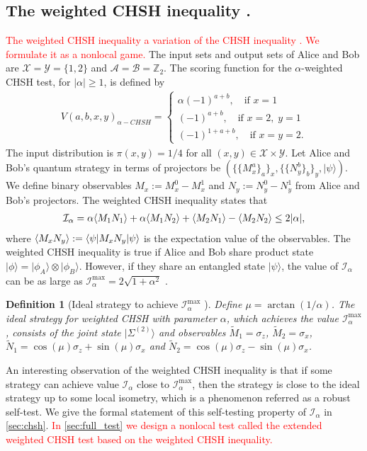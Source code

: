 \documentclass[11pt,letterpaper]{article}
\newcommand{\ket}[1]{|#1\rangle}
\newcommand{\bra}[1]{\langle#1|}
\newcommand{\x}{\otimes}
\DeclarePairedDelimiter{\ip}{\langle}{\rangle}
\newcommand{\Z}{\mathbb{Z}}
\newcommand{\calX}{\mathcal{X}}
\newcommand{\calY}{\mathcal{Y}}
\newcommand{\calA}{\mathcal{A}}
\newcommand{\calB}{\mathcal{B}}
\newcommand{\1}{\mathbb{1}}
\newcommand{\EPR}[1]{\Sigma^{(#1)}}
\newcommand{\paulix}{\sigma_x}
\newcommand{\pauliz}{\sigma_z}
\newcommand{\tM}{\tilde{M}}
\newcommand{\tN}{\tilde{N}}
\newcommand{\I}{\mathcal{I}}
\newcommand{\hf}[1]{\textcolor{red}{#1}}
\newtheorem{definition}[theorem]{Definition}
\theoremstyle{definition}
\begin{document}
\subsection{The weighted CHSH inequality \cite{acin2012}.}
\hf{The weighted CHSH inequality a variation of the CHSH inequality \cite{chsh}. 
We formulate it as a nonlocal game.}
The input sets and output sets of Alice and Bob are
$\calX = \calY = \{1, 2\}$ and $\calA = \calB = \Z_2$.
The scoring function for the $\alpha$-weighted CHSH test, for $|\alpha|\geq 1$, is defined by
\begin{align}
	V(a,b,x,y)_{\alpha-CHSH} = 
	\begin{cases}
		\alpha (-1)^{a + b}, \quad \text{if } x = 1 \\
		(-1)^{a + b}, \quad \text{if } x = 2,\; y = 1 \\
		(-1)^{1 + a + b}, \quad \text{if } x = y = 2.
	\end{cases}
\end{align}
The input distribution is $\pi(x,y) = 1/4$ for all $(x,y) \in \calX \times \calY$.
Let Alice and Bob's quantum strategy in terms of projectors be $( \{\{M_x^a\}_a\}_x, \{\{N_y^b\}_b\}_y, \ket{\psi})$. 
We define binary observables $M_x := M_x^0 - M_x^1$ and $N_y := N_y^0 - N_y^1$ from Alice and Bob's projectors.
The weighted CHSH inequality states that 
\begin{align}
	\label{eq:chsh_op}
	\I_\alpha = \alpha\ip{M_1N_1}+\alpha\ip{M_1N_2} + \ip{M_2N_1} - \ip{M_2N_2}\leq 2|\alpha|,
\end{align}
where $\ip{M_x N_y} := \bra{\psi} M_x N_y \ket{\psi}$ is the expectation value of the observables. 
The weighted CHSH inequality is true 
if Alice and Bob share product state $\ket{\phi} = \ket{\phi_A} \x \ket{\phi_B}$.
However, if they share an entangled state $\ket{\psi}$, the value of $\I_\alpha$ can be as large as
$ \I_\alpha^{\max} = 2\sqrt{1+\alpha^2}$ \cite{acin2012}.
\begin{definition}[Ideal strategy to achieve $\I_\alpha^{\max}$ \cite{acin2012}]
	\label{def:ideal}
	Define $\mu = \arctan(1/\alpha)$.
	The ideal strategy for weighted CHSH with parameter $\alpha$, which achieves the value $\I_\alpha^{\max}$, 
	consists of the joint state $\ket{\EPR{2}}$ and observables $\tM_1 = \pauliz$, $\tM_2 = \paulix$,
	$\tN_1 = \cos(\mu) \pauliz+ \sin(\mu) \paulix$ and $\tN_2 = \cos(\mu) \pauliz - \sin(\mu) \paulix$.
\end{definition}
An interesting observation of the weighted CHSH inequality is that if some strategy can achieve 
value $\I_\alpha$ close to $\I_\alpha^{\max}$, then the strategy is close to the ideal 
strategy up to some local isometry, 
which is a phenomenon referred as a robust self-test.
We give the formal statement of this self-testing property of $\I_\alpha$ in \cref{sec:chsh}.
\hf{In \cref{sec:full_test} we design
a nonlocal test called the extended weighted CHSH test based on the weighted CHSH inequality.}
\end{document}
